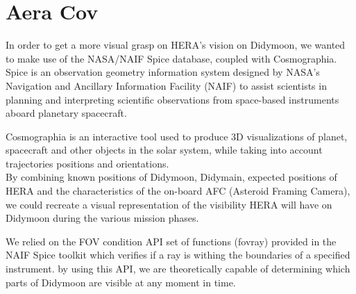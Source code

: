 \section{Aera Cov}
\label{Aeracov}

In order to get a more visual grasp on HERA's vision on Didymoon, we wanted to make use of the NASA/NAIF Spice database, coupled with Cosmographia.\\ 

Spice is an observation geometry information system designed by NASA's Navigation and Ancillary Information Facility (NAIF) to assist scientists in planning and interpreting scientific observations from space-based instruments aboard planetary spacecraft. 

Cosmographia is an interactive tool used to produce 3D visualizations of planet, spacecraft and other objects in the solar system, while taking into account trajectories positions and orientations.\\[10pt]

By combining known positions of Didymoon, Didymain, expected positions of HERA and the characteristics of the on-board AFC (Asteroid Framing Camera), we could recreate a visual representation of the visibility HERA will have on Didymoon during the various mission phases. 

We relied on the FOV condition API set of functions (fovray) provided in the NAIF Spice toolkit which verifies if a ray is withing the boundaries of a specified instrument. 
by using this API, we are theoretically capable of determining which parts of Didymoon are visible at any moment in time. 
